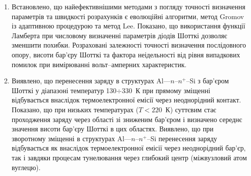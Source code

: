 \begin{enumerate}[leftmargin=0cm,itemindent=3em]
   \item Встановлено, що найефективнішими методами з погляду точності визначення параметрів та швидкості розрахунків є еволюційні алгоритми, метод Gromov із адаптивною процедурою та метод Lee.
    Показано, що використання функції Ламберта при числовому визначенні параметрів діодів Шотткі дозволяє зменшити похибки.
    Розраховані залежності точності визначення послідовного опору, висоти бар'єру Шотткі та фактора неідельності від %
    рівня випадкових помилок при вимірюванні вольт--амперних характеристик.

   \item
Виявлено, що  перенесення заряду в структурах Al---$n$--$n^+$--Si з бар'єром Шотткі у діапазоні температур 130$\div$330~К при прямому зміщенні відбувається внаслідок термоелектронної емісії через неоднорідний контакт.
        Показано, що при низьких температурах ($T<220$~К) суттєвим стає проходження заряду через області зі зниженим бар'єром і визначено середнє значення висоти бар'єру Шотткі в цих областях.
     Виявлено, що при зворотному зміщенні в структурах Al---$n$--$n^+$--Si перенесення заряду відбувається як внаслідок термоелектронної емісії через неоднорідний бар'єр, так і завдяки процесам тунелювання через глибокий центр (міжвузловий атом вуглецю).


\end{enumerate}
